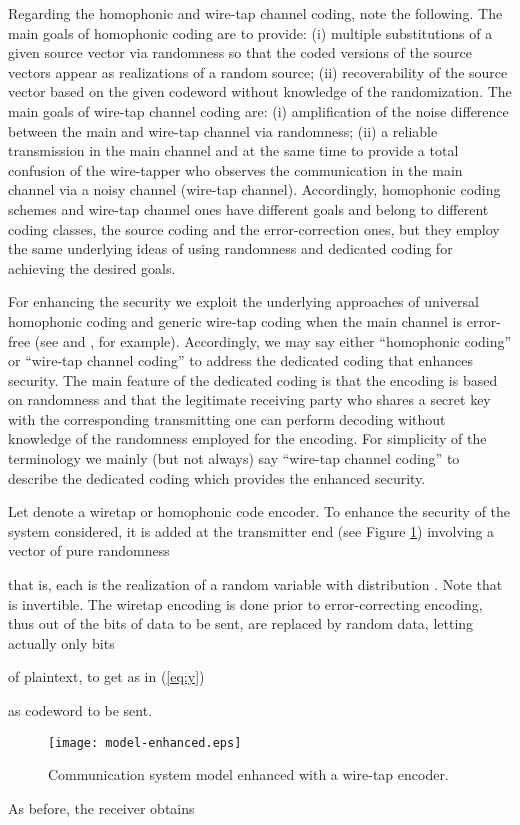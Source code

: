 \documentclass{article}[11pt]
\begin{document}
Regarding the homophonic and wire-tap channel coding, note the
following. The main goals of homophonic coding are to provide:
(i) multiple substitutions of a given source vector via
randomness so that the coded versions of the source vectors appear
as realizations of a random source; (ii) recoverability of the
source vector based on the given codeword without knowledge of the
randomization. The main goals of wire-tap channel coding are:
(i) amplification of the noise difference between the main and
wire-tap channel via randomness; (ii) a reliable
transmission in the main channel and at the same time to provide a
total confusion of the wire-tapper who observes the communication
in the main channel via a noisy channel (wire-tap channel).
Accordingly, homophonic coding schemes and wire-tap channel ones
have different goals and belong to different coding classes,
the source coding and the error-correction ones, but they employ
the same underlying ideas of using randomness and dedicated
coding for achieving the desired goals.

For enhancing the security we exploit the underlying approaches of
universal homophonic coding \cite{massey-1994} and generic
wire-tap coding when the main channel is error-free (see
\cite{wyner} and \cite{thangaraj-IEEE-IT-2007}, for example).
Accordingly, we may say either
``homophonic coding'' or ``wire-tap channel coding'' to address
the dedicated coding that enhances security. The
main feature of the dedicated coding is that the
encoding is based on randomness and that the
legitimate receiving party who shares a secret key with the
corresponding transmitting one can perform decoding without
knowledge of the randomness employed for the encoding. For
simplicity of the terminology we mainly (but not always) say
``wire-tap channel coding'' to describe the dedicated coding which
provides the enhanced security.

Let  denote a wiretap or homophonic code encoder. To
enhance the security of the system considered, it is added at the
transmitter end (see Figure \ref{fig:figure-2}) involving a vector
of pure randomness

that is, each  is the realization of a random variable  with
distribution .
Note that  is invertible.
The wiretap encoding is done prior to error-correcting encoding, thus
out of the  bits of data to be sent,  are replaced by random data,
letting actually only  bits

of plaintext, to get as in (\ref{eq:y})

as codeword to be sent.
\begin{figure}\leavevmode
\begin{center}
\texttt{[image: model-enhanced.eps]}
\caption{Communication system model enhanced with a wire-tap encoder.}
\label{fig:figure-2}
\end{center}
\end{figure}
As before, the receiver obtains
\end{document}
